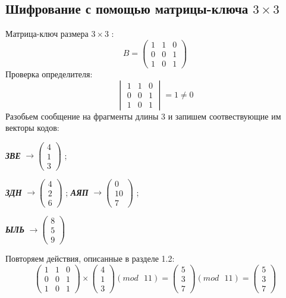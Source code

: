 \documentclass[a5paper, 10pt]{article}
\theoremstyle{definition}
\theoremstyle{plain}
\theoremstyle{remark}
\begin{document}
\subsection{Шифрование с помощью матрицы-ключа $3 \times 3$}
Матрица-ключ размера  $3 \times 3$ :
\begin{equation}
B =
\begin{pmatrix}
1 & 1 & 0 \\
0 & 0 & 1\\
1 & 0 & 1
\end{pmatrix}
\end{equation}
Проверка определителя:
\begin{equation}
\begin{vmatrix}
1 & 1 & 0 \\
0 & 0 & 1\\
1 & 0 & 1
\end{vmatrix}
= 1 \neq 0
\end{equation}
Разобьем сообщение на фрагменты длины 3 и запишем соотвествующие им векторы кодов:
\begin{center}
\textbf{\textit{ЗВЕ}} $\to \begin{pmatrix}
 4\\
1\\
3
\end{pmatrix}$ ;

\textbf{\textit{ЗДН}}  $\to \begin{pmatrix}
4\\
 2\\
6
\end{pmatrix}$ ;
\textbf{\textit{АЯП}}  $\to \begin{pmatrix}
 0\\
10\\
7
\end{pmatrix}$ ;

\textbf{\textit{ЫЛЬ}}  $\to \begin{pmatrix}
8\\
 5\\
9
\end{pmatrix}$ \\
\end{center}
Повторяем действия, описанные в разделе 1.2:
\begin{equation}
\begin{pmatrix}
 1 & 1 & 0 \\
0 & 0 & 1\\
1 & 0 & 1
\end{pmatrix}
 \times
\begin{pmatrix}
 4\\
1\\
3
\end{pmatrix}
(mod \text{ }11)
= 
\begin{pmatrix}
 5\\
3\\
7
\end{pmatrix}
(mod \text{ }11)
= \begin{pmatrix}
5 \\
3\\
7
\end{pmatrix}
\end{equation}
\end{document}
